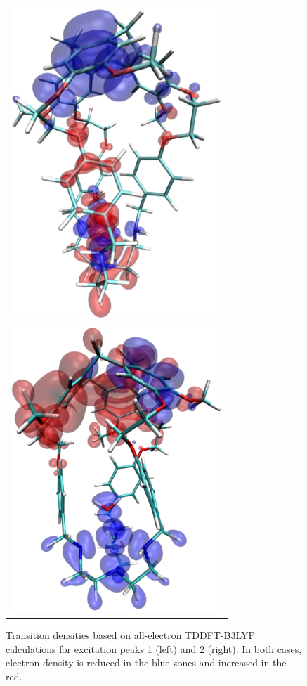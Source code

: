\documentclass[aip,reprint,nofootinbib]{revtex4-1}
\begin{document}
\begin{figure}
\begin{tabular}{c}
\includegraphics[width=8cm]{peak1} \\
\includegraphics[width=8cm]{peak2}
\end{tabular}
\caption[Transition densities for Cu(II)hemicrytophane.]{Transition densities based on all-electron TDDFT-B3LYP calculations for excitation peaks 1 (left) and 2 (right). In both cases, electron density is reduced in the blue zones and increased in the red.}\label{fig:alletrdens}
\end{figure}
\end{document}

